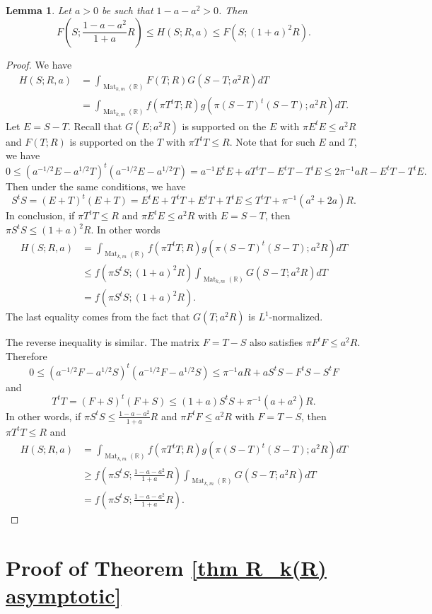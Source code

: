 \documentclass[oneside]{amsart}
\numberwithin{equation}{section}
\newtheorem{lemma}[theorem]{Lemma}
\theoremstyle{definition}
\theoremstyle{remark}
\theoremstyle{remark}
\newcommand{\RR}{\mathbb R}
\DeclareMathOperator{\Mat}{Mat}
\begin{document}
\begin{lemma}\label{lem bounds convolution}
Let $a>0$ be such that $1-a-a^2>0$. Then
$$F\left(S;\frac{1-a-a^2}{1+a}R\right)\leq H(S;R,a)\leq F(S;(1+a)^2R).$$
\end{lemma}

\begin{proof}
We have
\begin{align*}
H(S;R,a)&=\int_{\Mat_{k,m}(\RR)}F(T;R)G(S-T;a^2R)dT\\
	&=\int_{\Mat_{k,m}(\RR)}f(\pi T^tT;R)g(\pi(S-T)^t(S-T);a^2R)dT.
\end{align*}
Let $E=S-T$. Recall that $G(E;a^2R)$ is supported on the $E$ with $\pi E^tE\leq a^2R$ and $F(T;R)$ is supported on the $T$ with $\pi T^tT\leq R$. Note that for such $E$ and $T$, we have
$$0\leq(a^{-1/2}E-a^{1/2}T)^t(a^{-1/2}E-a^{1/2}T)=a^{-1}E^tE+aT^tT-E^tT-T^tE\leq2\pi^{-1}aR-E^tT-T^tE.$$
Then under the same conditions, we have
$$S^tS=(E+T)^t(E+T)=E^tE+T^tT+E^tT+T^tE\leq T^tT+\pi^{-1}(a^2+2a)R.$$
In conclusion, if $\pi T^tT\leq R$ and $\pi E^tE\leq a^2R$ with $E=S-T$, then $\pi S^tS\leq(1+a)^2R$. In other words
\begin{align*}
H(S;R,a)&=\int_{\Mat_{k,m}(\RR)}f(\pi T^tT;R)g(\pi(S-T)^t(S-T);a^2R)dT\\
	&\leq f(\pi S^tS;(1+a)^2R)\int_{\Mat_{k,m}(\RR)}G(S-T;a^2R)dT\\
	&=f(\pi S^tS;(1+a)^2R).
\end{align*}
The last equality comes from the fact that $G(T;a^2R)$ is $L^1$-normalized.

The reverse inequality is similar. The matrix $F=T-S$ also satisfies $\pi F^tF\leq a^2R$. Therefore
$$0\leq(a^{-1/2}F-a^{1/2}S)^t(a^{-1/2}F-a^{1/2}S)\leq\pi^{-1}aR+aS^tS-F^tS-S^tF$$
and
$$T^tT=(F+S)^t(F+S)\leq(1+a)S^tS+\pi^{-1}(a+a^2)R.$$
In other words, if $\pi S^tS\leq\frac{1-a-a^2}{1+a}R$ and $\pi F^tF\leq a^2R$ with $F=T-S$, then $\pi T^tT\leq R$ and
\begin{align*}
H(S;R,a)&=\int_{\Mat_{k,m}(\RR)}f(\pi T^tT;R)g(\pi(S-T)^t(S-T);a^2R)dT\\
	&\geq f\left(\pi S^tS;\frac{1-a-a^2}{1+a}R\right)\int_{\Mat_{k,m}(\RR)}G(S-T;a^2R)dT\\
	&=f\left(\pi S^tS;\frac{1-a-a^2}{1+a}R\right).
\end{align*}
\end{proof}





\section{Proof of Theorem \ref{thm R_k(R) asymptotic}}\label{sec proof of thm}
\end{document}
